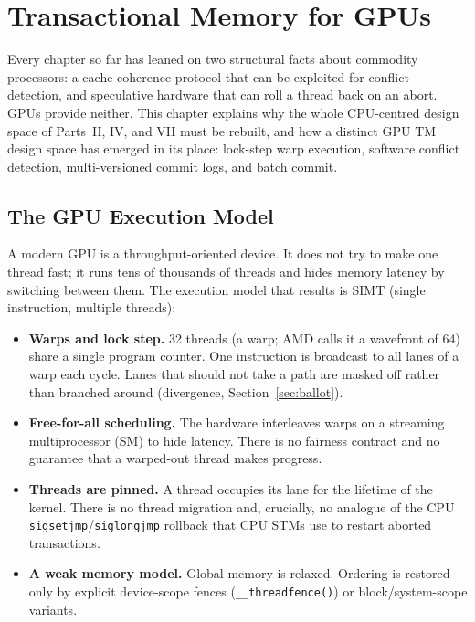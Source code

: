 \chapter{Transactional Memory for GPUs}
\label{chap:gpu-tm}

Every chapter so far has leaned on two structural facts about commodity
processors: a cache-coherence protocol that can be exploited for conflict
detection, and speculative hardware that can roll a thread back on an abort.
GPUs provide neither. This chapter explains why the whole CPU-centred design
space of Parts~II, IV, and VII must be rebuilt, and how a distinct GPU TM
design space has emerged in its place: lock-step warp execution, software
conflict detection, multi-versioned commit logs, and batch commit.

\section{The GPU Execution Model}

A modern GPU is a throughput-oriented device. It does not try to make one
thread fast; it runs tens of thousands of threads and hides memory latency
by switching between them. The execution model that results is SIMT
(single instruction, multiple threads):

\begin{itemize}
    \item \textbf{Warps and lock step.} 32 threads (a warp; AMD calls it a
          wavefront of 64) share a single program counter. One instruction is
          broadcast to all lanes of a warp each cycle. Lanes that should not
          take a path are masked off rather than branched around
          (divergence, Section~\ref{sec:ballot}).
    \item \textbf{Free-for-all scheduling.} The hardware interleaves warps on
          a streaming multiprocessor (SM) to hide latency. There is no
          fairness contract and no guarantee that a warped-out thread makes
          progress.
    \item \textbf{Threads are pinned.} A thread occupies its lane for the
          lifetime of the kernel. There is no thread migration and, crucially,
          no analogue of the CPU \texttt{sigsetjmp}/\texttt{siglongjmp}
          rollback that CPU STMs use to restart aborted transactions.
    \item \textbf{A weak memory model.} Global memory is relaxed. Ordering is
          restored only by explicit device-scope fences
          (\texttt{\_\_threadfence()}) or block/system-scope variants.
\end{itemize}

